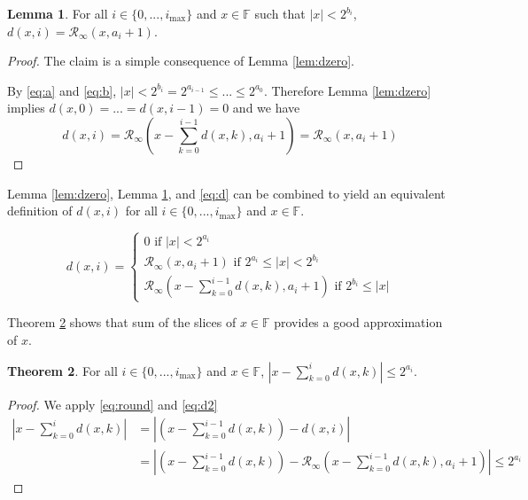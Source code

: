 \documentclass[12pt]{article}
\providecommand{\F}{\ensuremath{\mathbb{F}}}
\providecommand{\max}{\ensuremath{\text{max}}}
\providecommand{\roundtonearestinfty}{\ensuremath{\mathcal{R}_\text{$\infty$}}}
\theoremstyle{definition}
\newtheorem{thm}{Theorem}[section]
\newtheorem{lem}[thm]{Lemma}
\numberwithin{equation}{section}
\numberwithin{figure}{section}
\begin{document}
    \begin{samepage}
    \begin{lem}
      For all $i \in \{0, ..., i_{\max}\}$ and $x \in \F$ such that $|x| < 2^{b_i}$, $d(x, i) = \roundtonearestinfty(x, a_i + 1)$.
      \label{lem:dmiddle}
    \end{lem}
    \end{samepage}

    \begin{proof}
      The claim is a simple consequence of Lemma \ref{lem:dzero}.

      By  \eqref{eq:a} and \eqref{eq:b}, $|x| < 2^{b_i} = 2^{a_{i - 1}} \leq  ... \leq 2^{a_0}$. Therefore Lemma \ref{lem:dzero} implies $d(x, 0) = ... = d(x, i - 1) = 0$ and we have \begin{equation*}
        d(x, i) = \roundtonearestinfty(x - \sum\limits_{k = 0}^{i - 1}d(x, k), a_{i} + 1) = \roundtonearestinfty(x, a_{i} + 1)
      \end{equation*}
    \end{proof}

    Lemma \ref{lem:dzero}, Lemma \ref{lem:dmiddle}, and \eqref{eq:d} can be combined to yield an equivalent definition of $d(x, i)$ for all $i \in \{0, ..., i_{\max}\}$ and $x \in \F$.

    \begin{equation}
      d(x, i) = \begin{cases}0 \text{ if } |x| < 2^{a_i}\\ \roundtonearestinfty(x, a_i + 1) \text{ if } 2^{a_i} \leq |x| < 2^{b_i}\\\roundtonearestinfty(x - \sum\limits_{k=0}^{i - 1}d(x,k), a_i + 1) \text{ if } 2^{b_i} \leq |x| \end{cases}
      \label{eq:d2}
    \end{equation}

    Theorem \ref{thm:dround} shows that sum of the slices of $x \in \F$ provides a good approximation of $x$.

    \begin{samepage}
    \begin{thm}
      For all $i \in \{0, ..., i_{\max}\}$ and $x \in \F$, $|x - \sum \limits_{k = 0}^id(x, k)| \leq 2^{a_i}$.
      \label{thm:dround}
    \end{thm}
    \end{samepage}

    \begin{proof}
      We apply  \eqref{eq:round} and \eqref{eq:d2}
      \begin{align*}
        |x - \sum \limits_{k = 0}^{i}d(x, k)| & = |(x - \sum \limits_{k = 0}^{i - 1}d(x, k)) - d(x, i)| \\
         & = |(x - \sum \limits_{k = 0}^{i - 1}d(x, k)) - \roundtonearestinfty(x - \sum \limits_{k = 0}^{i - 1}d(x, k), a_{i} + 1)| \leq 2^{a_{i}}
      \end{align*}
    \end{proof}
\end{document}
